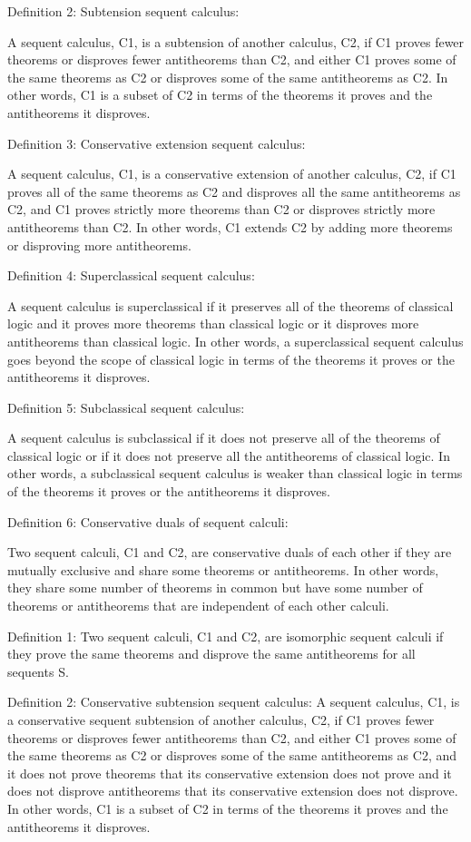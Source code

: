 \documentclass{article}
\begin{document}
Definition 2: Subtension sequent calculus:

A sequent calculus, C1, is a subtension of another calculus, C2, if C1 proves fewer theorems or disproves fewer antitheorems than C2, and either C1 proves some of the same theorems as C2 or disproves some of the same antitheorems as C2. In other words, C1 is a subset of C2 in terms of the theorems it proves and the antitheorems it disproves.

Definition 3: Conservative extension sequent calculus:

A sequent calculus, C1, is a conservative extension of another calculus, C2, if C1 proves all of the same theorems as C2 and disproves all the same antitheorems as C2, and C1 proves strictly more theorems than C2 or disproves strictly more antitheorems than C2. In other words, C1 extends C2 by adding more theorems or disproving more antitheorems.

Definition 4: Superclassical sequent calculus:

A sequent calculus is superclassical if it preserves all of the theorems of classical logic and it proves more theorems than classical logic or it disproves more antitheorems than classical logic. In other words, a superclassical sequent calculus goes beyond the scope of classical logic in terms of the theorems it proves or the antitheorems it disproves.

Definition 5: Subclassical sequent calculus:

A sequent calculus is subclassical if it does not preserve all of the theorems of classical logic or if it does not preserve all the antitheorems of classical logic. In other words, a subclassical sequent calculus is weaker than classical logic in terms of the theorems it proves or the antitheorems it disproves.

Definition 6: Conservative duals of sequent calculi:

Two sequent calculi, C1 and C2, are conservative duals of each other if they are mutually exclusive and share some theorems or antitheorems. In other words, they share some number of theorems in common but have some number of theorems or antitheorems that are independent of each other calculi.

Definition 1:
Two sequent calculi, C1 and C2, are isomorphic sequent calculi if they prove the same theorems and disprove the same antitheorems for all sequents S.

Definition 2: Conservative subtension sequent calculus:
A sequent calculus, C1, is a conservative sequent subtension of another calculus, C2, if C1 proves fewer theorems or disproves fewer antitheorems than C2, and either C1 proves some of the same theorems as C2 or disproves some of the same antitheorems as C2, and it does not prove theorems that its conservative extension does not prove and it does not disprove antitheorems that its conservative extension does not disprove. In other words, C1 is a subset of C2 in terms of the theorems it proves and the antitheorems it disproves.
\end{document}
